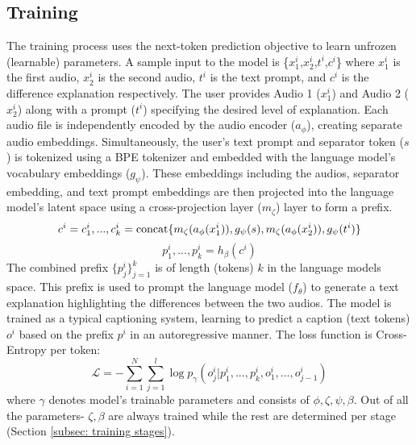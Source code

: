 \subsection{Training} \label{subsec: training} \vspace{-0.1in}
The training process uses the next-token prediction objective to learn unfrozen (learnable) parameters. A sample input to the model is \{$x_1^i$,$x_2^i$,$t^i$,$c^i$\} where $x_1^i$ is the first audio, $x_2^i$ is the second audio, $t^i$ is the text prompt, and $c^i$ is the difference explanation respectively. The user provides Audio 1 ($x_1^i$) and Audio 2 ($x_2^i$) along with a prompt ($t^i$) specifying the desired level of explanation. Each audio file is independently encoded by the audio encoder ($a_\phi$), creating separate audio embeddings. Simultaneously, the user’s text prompt and separator token ($s$) is tokenized using a BPE tokenizer and embedded with the language model’s vocabulary embeddings ($g_\psi$). These embeddings including the audios, separator embedding, and text prompt embeddings are then projected into the language model’s latent space using a cross-projection layer ($m_\zeta$) layer to form a prefix. 
\vspace{-0.05in}
\begin{equation}
    c^i = c^i_1,...,c^i_{k} = \text{concat}\{m_\zeta(a_\phi(x_1^i)), g_\psi(s),m_\zeta(a_\phi(x_2^i)),g_\psi(t^i)\} \label{equation: prefix}
    \vspace{-0.05in}
\end{equation}
\vspace{-0.05in}
\begin{equation}
    p^i_1,...,p^i_{k} = h_\beta(c^i) \label{equation: cross prefix} 
\end{equation}
The combined prefix $\{p^i_j\}_{j=1}^k$ is of length (tokens) $k$ in the language models space. This prefix is used to prompt the language model ($f_\theta$) to generate a text explanation highlighting the differences between the two audios. The model is trained as a typical captioning system, learning to predict a caption (text tokens) $o^i$ based on the prefix $p^i$ in an autoregressive manner. The loss function is Cross-Entropy per token:
\begin{equation}
\mathcal{L} = - \sum_{i=1}^N \sum_{j=1}^{l} \log p_{\gamma} (o^i_j| p^i_1,...,p^i_{k}, o^i_1,...,o^i_{j-1}) 
\end{equation}
where $\gamma$ denotes model's trainable parameters and consists of $\phi,\zeta,\psi,\beta$. Out of all the parameters- $\zeta,\beta$ are always trained while the rest are determined per stage (Section \ref{subsec: training stages}).

